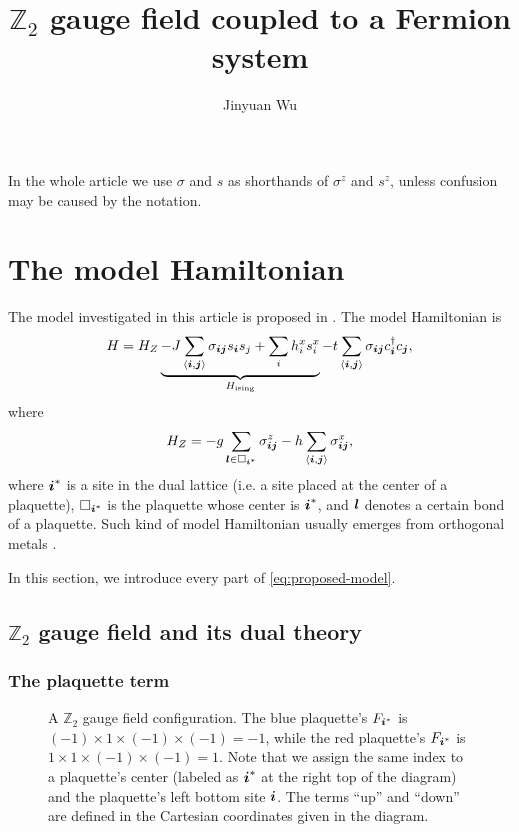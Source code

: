 \documentclass[hyperref, a4paper]{article}
\title{$\mathbb{Z}_2$ gauge field coupled to a Fermion system}
\author{Jinyuan Wu}
\newcommand*{\pair}[1]{\langle #1 \rangle}
\begin{document}
\maketitle

In the whole article we use $\sigma$ and $s$ as shorthands of $\sigma^z$ and $s^z$, unless confusion may be caused by the notation.

\section{The model Hamiltonian}

The model investigated in this article is proposed in \cite{moon2019deconfined}.
The model Hamiltonian is 
\begin{equation}
    H = H_Z \underbrace{- J \sum_{\pair{\vb*{i}, \vb*{j}}} \sigma_{\vb*{i} \vb*{j}} s_{\vb*{i}} s_j + \sum_i h^x_i s^x_i}_{H_\text{ising}} - t \sum_{\pair{\vb*{i}, \vb*{j}}} \sigma_{\vb*{i} \vb*{j}} c^\dagger_{\vb*{i}} c_{\vb*{j}},
    \label{eq:proposed-model}
\end{equation}
where
\begin{equation}
    H_Z = - g \sum_{\vb*{l} \in \Box_{\vb*{i}^*}} \sigma_{\vb*{i} \vb*{j}}^z - h \sum_{\pair{\vb*{i}, \vb*{j}}} \sigma^x_{\vb*{i} \vb*{j}}, 
\end{equation}
where $\vb*{i}^*$ is a site in the dual lattice (i.e. a site placed at the center of a plaquette), $\Box_{\vb*{i}^*}$ is the plaquette whose center is $\vb*{i}^*$, and $\vb*{l}$ denotes a certain bond of a plaquette.
Such kind of model Hamiltonian usually emerges from orthogonal metals \cite{orthogonal_metal}.

In this section, we introduce every part of \eqref{eq:proposed-model}.

\subsection{$\mathbb{Z}_2$ gauge field and its dual theory}

\subsubsection{The plaquette term}

\begin{figure}
    \centering
    
    \caption{A $\mathbb{Z}_2$ gauge field configuration. The blue plaquette's $F_{\vb*{i}^*}$ is $(-1) \times 1 \times (-1) \times (-1) = -1$, while the red plaquette's $F_{\vb*{i}^*}$ is $1 \times 1 \times (-1) \times (-1) = 1$. Note that we assign the same index to a plaquette's center (labeled as $\vb*{i}^*$ at the right top of the diagram) and the plaquette's left bottom site $\vb*{i}$. The terms ``up'' and ``down'' are defined in the Cartesian coordinates given in the diagram.}
    \label{fig:z2-gauge-field}
\end{figure}
\end{document}
